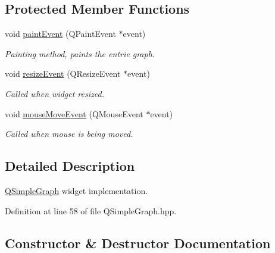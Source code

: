 \subsection*{Protected Member Functions}
\begin{DoxyCompactItemize}
\item 
void \hyperlink{class_fossa_1_1_q_simple_graph_1_1_q_simple_graph_a6559739099820e1303c1dbe2c5757bc4}{paint\+Event} (Q\+Paint\+Event $\ast$event)
\begin{DoxyCompactList}\small\item\em Painting method, paints the entrie graph. \end{DoxyCompactList}\item 
void \hyperlink{class_fossa_1_1_q_simple_graph_1_1_q_simple_graph_a4399efbb6a02fafa1e0198463d302e29}{resize\+Event} (Q\+Resize\+Event $\ast$event)
\begin{DoxyCompactList}\small\item\em Called when widget resized. \end{DoxyCompactList}\item 
void \hyperlink{class_fossa_1_1_q_simple_graph_1_1_q_simple_graph_a7ae9773902324fc533f0b18294f7c516}{mouse\+Move\+Event} (Q\+Mouse\+Event $\ast$event)
\begin{DoxyCompactList}\small\item\em Called when mouse is being moved. \end{DoxyCompactList}\end{DoxyCompactItemize}


\subsection{Detailed Description}
\hyperlink{class_fossa_1_1_q_simple_graph_1_1_q_simple_graph}{Q\+Simple\+Graph} widget implementation. 

Definition at line 58 of file Q\+Simple\+Graph.\+hpp.



\subsection{Constructor \& Destructor Documentation}
\mbox{\label{class_fossa_1_1_q_simple_graph_1_1_q_simple_graph_ab08b1293b3698e1e179a8d36dc737c77}} 
